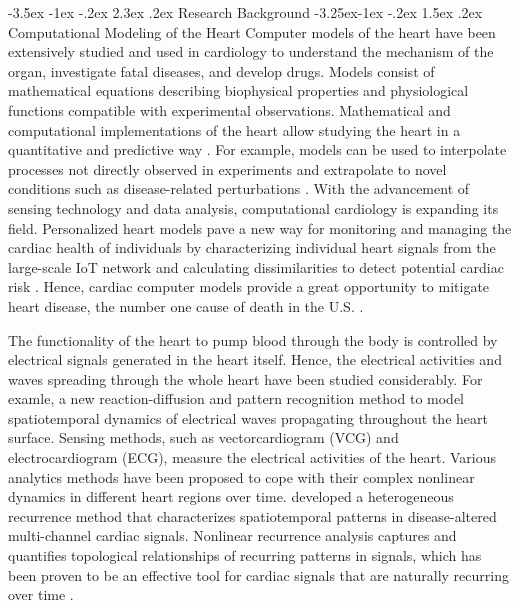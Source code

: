 \documentclass[11pt]{article}
\makeatletter
\renewcommand\section{\@startsection {section}{1}{\z@}%
                                   {-3.5ex \@plus -1ex \@minus -.2ex}%
                                   {2.3ex \@plus.2ex}%
                                   {\normalfont\fontfamily{phv}\fontsize{16}{19}\bfseries}}
\renewcommand\subsection{\@startsection{subsection}{2}{\z@}%
                                     {-3.25ex\@plus -1ex \@minus -.2ex}%
                                     {1.5ex \@plus .2ex}%
                                     {\normalfont\fontfamily{phv}\fontsize{14}{17}\bfseries}}
\makeatother
\begin{document}
\section{Research Background}
\subsection{Computational Modeling of the Heart}
Computer models of the heart have been extensively studied and used in cardiology to understand the mechanism of the organ, investigate fatal diseases, and develop drugs. Models consist of mathematical equations describing biophysical properties and physiological functions compatible with experimental observations. Mathematical and computational implementations of the heart allow studying the heart in a quantitative and predictive way \citep{whittaker2020calibration}. For example, models can be used to interpolate processes not directly observed in experiments and extrapolate to novel conditions such as disease-related perturbations \citep{rodriguez2010systems}. With the advancement of sensing technology and data analysis, computational cardiology is expanding its field. Personalized heart models pave a new way for monitoring and managing the cardiac health of individuals by characterizing individual heart signals from the large-scale IoT network and calculating dissimilarities to detect potential cardiac risk \citep{yang2020network}. Hence, cardiac computer models provide a great opportunity to mitigate heart disease, the number one cause of death in the U.S. \citep{murphy2021mortality}.

The functionality of the heart to pump blood through the body is controlled by electrical signals generated in the heart itself. Hence, the electrical activities and waves spreading through the whole heart have been studied considerably. For examle, \citet{yang2016whole} a new reaction-diffusion and pattern recognition method to model spatiotemporal dynamics of electrical waves propagating throughout the heart surface. Sensing methods, such as vectorcardiogram (VCG) and electrocardiogram (ECG), measure the electrical activities of the heart. Various analytics methods have been proposed to cope with their complex nonlinear dynamics in different heart regions over time. \citet{chen2019heterogeneous} developed a heterogeneous recurrence method that characterizes spatiotemporal patterns in disease-altered multi-channel cardiac signals. Nonlinear recurrence analysis captures and quantifies topological relationships of recurring patterns in signals, which has been proven to be an effective tool for cardiac signals that are naturally recurring over time \citep{yang2010multiscale,meyers2020cross}. 
\end{document}
